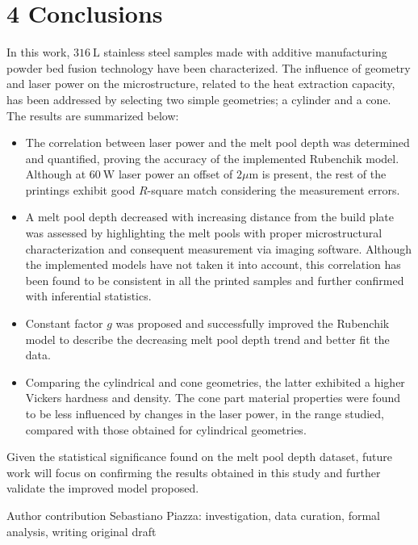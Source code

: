 \documentclass[10pt]{article}
\begin{document}
\section*{4 Conclusions}
In this work, $316 \mathrm{~L}$ stainless steel samples made with additive manufacturing powder bed fusion technology have been characterized. The influence of geometry and laser power on the microstructure, related to the heat extraction capacity, has been addressed by selecting two simple geometries; a cylinder and a cone. The results are summarized below:

\begin{itemize}
  \item The correlation between laser power and the melt pool depth was determined and quantified, proving the accuracy of the implemented Rubenchik model. Although at $60 \mathrm{~W}$ laser power an offset of $2 \mu \mathrm{m}$ is present, the rest of the printings exhibit good $R$-square match considering the measurement errors.

  \item A melt pool depth decreased with increasing distance from the build plate was assessed by highlighting the melt pools with proper microstructural characterization and consequent measurement via imaging software. Although the implemented models have not taken it into account, this correlation has been found to be consistent in all the printed samples and further confirmed with inferential statistics.

  \item Constant factor $g$ was proposed and successfully improved the Rubenchik model to describe the decreasing melt pool depth trend and better fit the data.

  \item Comparing the cylindrical and cone geometries, the latter exhibited a higher Vickers hardness and density. The cone part material properties were found to be less influenced by changes in the laser power, in the range studied, compared with those obtained for cylindrical geometries.

\end{itemize}

Given the statistical significance found on the melt pool depth dataset, future work will focus on confirming the results obtained in this study and further validate the improved model proposed.

Author contribution Sebastiano Piazza: investigation, data curation, formal analysis, writing original draft
\end{document}
